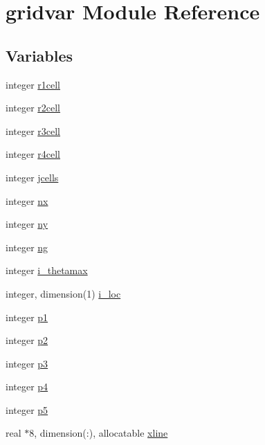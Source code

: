 \hypertarget{namespacegridvar}{}\section{gridvar Module Reference}
\label{namespacegridvar}
\subsection*{Variables}
\begin{DoxyCompactItemize}
\item 
integer \hyperlink{namespacegridvar_a82471622d62aa32eee56a7b6be0cde37}{r1cell}
\item 
integer \hyperlink{namespacegridvar_a3203ed7e5fd550ecd3db28a984a98e67}{r2cell}
\item 
integer \hyperlink{namespacegridvar_a9f25f936a91b900f3c0e92756b058baf}{r3cell}
\item 
integer \hyperlink{namespacegridvar_a95fdf111ad0de8db538800047d39fe2c}{r4cell}
\item 
integer \hyperlink{namespacegridvar_a8b64d7e709991664741ab52bd2cc4b0b}{jcells}
\item 
integer \hyperlink{namespacegridvar_ac50c143a371abc586b838320ddc88fdc}{nx}
\item 
integer \hyperlink{namespacegridvar_a8fa1d0ca6197d12780fa0fae9b209c07}{ny}
\item 
integer \hyperlink{namespacegridvar_ab9c5f3a5fcee79ab6ab60e5eeeddba0b}{ng}
\item 
integer \hyperlink{namespacegridvar_aa21ca71efd849f646cd7117ae4548ba3}{i\+\_\+thetamax}
\item 
integer, dimension(1) \hyperlink{namespacegridvar_aa2cdf2ef709244cb5a8170e1d0a75e6f}{i\+\_\+loc}
\item 
integer \hyperlink{namespacegridvar_a07e7022df38416a6d673644deb5b1c9e}{p1}
\item 
integer \hyperlink{namespacegridvar_a533dcfeb986dc18e2b0db537c859c6b7}{p2}
\item 
integer \hyperlink{namespacegridvar_a86eca560e31b5be73bfcdd95c5b4be72}{p3}
\item 
integer \hyperlink{namespacegridvar_af879defcd34121964abce7fb5f06c1e5}{p4}
\item 
integer \hyperlink{namespacegridvar_aeeca5c7ff039fec86cfa5159ba5dfaa9}{p5}
\item 
real $\ast$8, dimension(\+:), allocatable \hyperlink{namespacegridvar_ad36217840661114bf87efd88b8e0ef9f}{xline}
\item 

\end{DoxyCompactItemize}
